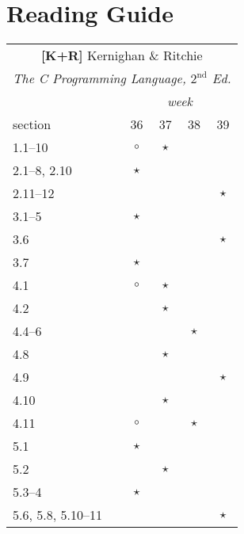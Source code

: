 \documentclass[a4paper]{article}
\newcommand{\refkr}{\textbf{[K+R]}\xspace}
\begin{document}
\section{Reading Guide}

\begin{table}
  \footnotesize
  \begin{minipage}[t]{0.5\columnwidth}
  \begin{tabular}{|l|c|c|c|c|}
    \hline
    \multicolumn{5}{|c|}{\refkr Kernighan \& Ritchie} \\
    \multicolumn{5}{|c|}{\emph{The C Programming Language, $2^\text{nd}$ Ed.}} \\
    \hline
                       & \multicolumn{4}{|c|}{\emph{week}} \\
    section            & 36      & 37      & 38      & 39 \\
    \hline
    1.1--10            & $\circ$ & $\star$ &         & \\
    \hline
    2.1--8, 2.10       & $\star$ &         &         & \\
    2.11--12           &         &         &         & $\star$ \\
    \hline
    3.1--5             & $\star$ &         &         & \\
    3.6                &         &         &         & $\star$ \\
    3.7                & $\star$ &         &         & \\
    \hline
    4.1                & $\circ$ & $\star$ &         & \\
    4.2                &         & $\star$ &         & \\
    4.4--6             &         &         & $\star$ & \\
    4.8                &         & $\star$ &         & \\
    4.9                &         &         &         & $\star$ \\
    4.10               &         & $\star$ &         & \\
    4.11               & $\circ$ &         & $\star$ & \\
    \hline
    5.1                & $\star$ &         &         & \\
    5.2                &         & $\star$ &         & \\
    5.3--4             & $\star$ &         &         & \\
    5.6, 5.8, 5.10--11 &         &         &         & $\star$ \\

\end{tabular}
\end{minipage}
\end{table}
\end{document}
